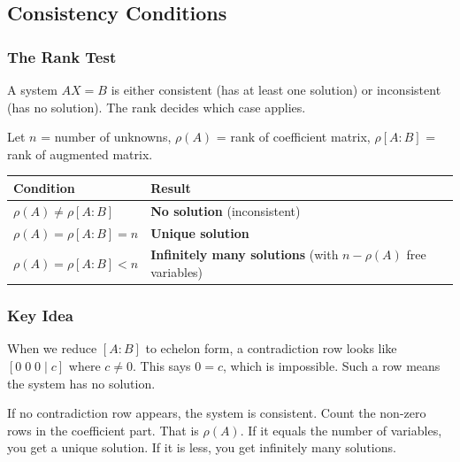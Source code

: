\documentclass[
]{article}
\begin{document}
\subsection{Consistency Conditions}\label{consistency-conditions}

\subsubsection{The Rank Test}\label{the-rank-test}

A system \(AX = B\) is either consistent (has at least one solution) or
inconsistent (has no solution). The rank decides which case applies.

Let \(n\) = number of unknowns, \(\rho(A)\) = rank of coefficient
matrix, \(\rho[A:B]\) = rank of augmented matrix.

\begin{longtable}[]{@{}
  >{\raggedright\arraybackslash}p{}
  >{\raggedright\arraybackslash}p{}@{}}
\toprule\noalign{}
\begin{minipage}[b]{\linewidth}\raggedright
Condition
\end{minipage} & \begin{minipage}[b]{\linewidth}\raggedright
Result
\end{minipage} \\
\midrule\noalign{}
\endhead
\bottomrule\noalign{}
\endlastfoot
\(\rho(A) \neq \rho[A:B]\) & \textbf{No solution} (inconsistent) \\
\(\rho(A) = \rho[A:B] = n\) & \textbf{Unique solution} \\
\(\rho(A) = \rho[A:B] < n\) & \textbf{Infinitely many solutions} (with
\(n - \rho(A)\) free variables) \\
\end{longtable}

\subsubsection{Key Idea}\label{key-idea-1}

When we reduce \([A:B]\) to echelon form, a contradiction row looks like
\([0 \; 0 \; 0 \; \lvert  \; c]\) where \(c \neq 0\). This says
\(0 = c\), which is impossible. Such a row means the system has no
solution.

If no contradiction row appears, the system is consistent. Count the
non-zero rows in the coefficient part. That is \(\rho(A)\). If it equals
the number of variables, you get a unique solution. If it is less, you
get infinitely many solutions.
\end{document}
